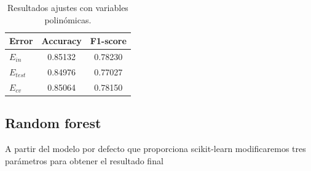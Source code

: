 \documentclass[11pt,a4paper]{article}
\begin{document}
\begin{table}[h]
\begin{center}
\begin{tabular}{|l|c|c|}
\hline
  Error & Accuracy & F1-score \\ \hline
  $E_{in}$ & 0.85132 & 0.78230 \\
  $E_{test}$ & 0.84976 & 0.77027  \\
  $E_{cv}$ &0.85064 & 0.78150  \\\hline
\end{tabular}
\caption{Resultados ajustes con variables polinómicas.}

\end{center}
\end{table}

\subsection{Random forest}

A partir del modelo por defecto que proporciona scikit-learn modificaremos tres parámetros para obtener el resultado final
\end{document}
